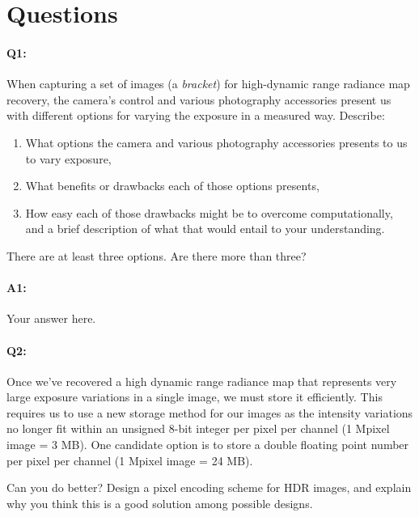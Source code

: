\documentclass[11pt]{article}
\begin{document}

\pagebreak
\section*{Questions}

\paragraph{Q1:} 
When capturing a set of images (a \emph{bracket}) for high-dynamic range radiance map recovery, the camera's control and various photography accessories present us with different options for varying the exposure in a measured way. Describe:
\begin{enumerate}
  \item What options the camera and various photography accessories presents to us to vary exposure,
  \item What benefits or drawbacks each of those options presents,
  \item How easy each of those drawbacks might be to overcome computationally, and a brief description of what that would entail to your understanding.
\end{enumerate}

There are at least three options. Are there more than three?

\paragraph{A1:} Your answer here.




\pagebreak
\paragraph{Q2:} 
Once we've recovered a high dynamic range radiance map that represents very large exposure variations in a single image, we must store it efficiently. This requires us to use a new storage method for our images as the intensity variations no longer fit within an unsigned 8-bit integer per pixel per channel (1 Mpixel image = 3 MB). One candidate option is to store a double floating point number per pixel per channel (1 Mpixel image = 24 MB).

Can you do better? Design a pixel encoding scheme for HDR images, and explain why you think this is a good solution among possible designs.
\end{document}
